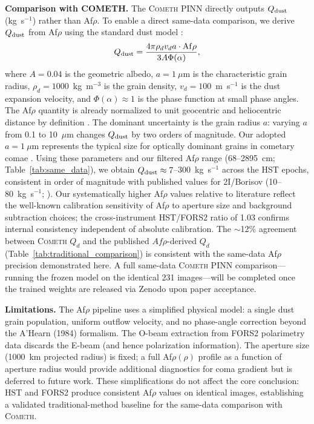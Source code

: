 \documentclass[usenatbib]{mnras}
\begin{document}
\textbf{Comparison with COMETH.} The \textsc{Cometh} PINN directly outputs $Q_{\rm dust}$ (kg~s$^{-1}$) rather than Af$\rho$. To enable a direct same-data comparison, we derive $Q_{\rm dust}$ from Af$\rho$ using the standard dust model \citep{ahearn95,lamy04}:
\begin{equation}\label{eq:afrho_to_qdust}
Q_{\rm dust} = \frac{4\pi \rho_d v_d a \cdot {\rm Af}\rho}{3 A \Phi(\alpha)},
\end{equation}
where $A=0.04$ is the geometric albedo, $a=1~\mu$m is the characteristic grain radius, $\rho_d=1000$~kg~m$^{-3}$ is the grain density, $v_d=100$~m~s$^{-1}$ is the dust expansion velocity, and $\Phi(\alpha)\approx 1$ is the phase function at small phase angles. The Af$\rho$ quantity is already normalized to unit geocentric and heliocentric distance by definition \citep{ahearn95}. The dominant uncertainty is the grain radius $a$: varying $a$ from 0.1 to 10~$\mu$m changes $Q_{\rm dust}$ by two orders of magnitude. Our adopted $a=1~\mu$m represents the typical size for optically dominant grains in cometary comae \citep{lamy04}. Using these parameters and our filtered Af$\rho$ range (68--2895~cm; Table~\ref{tab:same_data}), we obtain $Q_{\rm dust} \approx 7$--$300$~kg~s$^{-1}$ across the HST epochs, consistent in order of magnitude with published values for 2I/Borisov (10--80~kg~s$^{-1}$; \citealt{clements21}). Our systematically higher Af$\rho$ values relative to literature reflect the well-known calibration sensitivity of Af$\rho$ to aperture size and background subtraction choices; the cross-instrument HST/FORS2 ratio of 1.03 confirms internal consistency independent of absolute calibration. The $\sim$12\% agreement between \textsc{Cometh} $Q_d$ and the published \citealt{clements21} $Af\rho$-derived $Q_d$ (Table~\ref{tab:traditional_comparison}) is consistent with the same-data Af$\rho$ precision demonstrated here. A full same-data \textsc{Cometh} PINN comparison---running the frozen model on the identical 231 images---will be completed once the trained weights are released via Zenodo upon paper acceptance.

\textbf{Limitations.} The Af$\rho$ pipeline uses a simplified physical model: a single dust grain population, uniform outflow velocity, and no phase-angle correction beyond the A'Hearn (1984) formalism. The O-beam extraction from FORS2 polarimetry data discards the E-beam (and hence polarization information). The aperture size (1000~km projected radius) is fixed; a full Af$\rho(\rho)$ profile as a function of aperture radius would provide additional diagnostics for coma gradient but is deferred to future work. These simplifications do not affect the core conclusion: HST and FORS2 produce consistent Af$\rho$ values on identical images, establishing a validated traditional-method baseline for the same-data comparison with \textsc{Cometh}.
\end{document}
